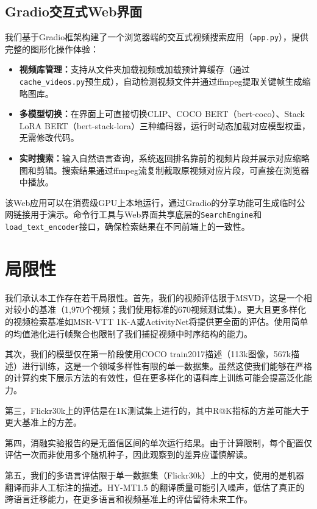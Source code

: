 \documentclass[10pt,a4paper]{ctexart}
\begin{document}
\subsection{Gradio交互式Web界面}

我们基于Gradio框架构建了一个浏览器端的交互式视频搜索应用（\texttt{app.py}），提供完整的图形化操作体验：

\begin{itemize}
  \item \textbf{视频库管理：}支持从文件夹加载视频或加载预计算缓存（通过\texttt{cache\_videos.py}预生成），自动检测视频文件并通过ffmpeg提取关键帧生成缩略图库。
  \item \textbf{多模型切换：}在界面上可直接切换CLIP、COCO BERT（bert-coco）、Stack LoRA BERT（bert-stack-lora）三种编码器，运行时动态加载对应模型权重，无需修改代码。
  \item \textbf{实时搜索：}输入自然语言查询，系统返回排名靠前的视频片段并展示对应缩略图和剪辑。搜索结果通过ffmpeg流复制截取原视频对应片段，可直接在浏览器中播放。
\end{itemize}

该Web应用可以在消费级GPU上本地运行，通过Gradio的分享功能可生成临时公网链接用于演示。命令行工具与Web界面共享底层的\texttt{SearchEngine}和\texttt{load\_text\_encoder}接口，确保检索结果在不同前端上的一致性。

\section{局限性}

我们承认本工作存在若干局限性。首先，我们的视频评估限于MSVD，这是一个相对较小的基准（1,970个视频；我们使用标准的670视频测试集）。更大且更多样化的视频检索基准如MSR-VTT 1K-A或ActivityNet将提供更全面的评估。使用简单的均值池化进行帧聚合也限制了我们捕捉视频中时序结构的能力。

其次，我们的模型仅在第一阶段使用COCO train2017描述（113k图像，567k描述）进行训练，这是一个领域多样性有限的单一数据集。虽然这使我们能够在严格的计算约束下展示方法的有效性，但在更多样化的语料库上训练可能会提高泛化能力。

第三，Flickr30k上的评估是在1K测试集上进行的，其中R@K指标的方差可能大于更大基准上的方差。

第四，消融实验报告的是无置信区间的单次运行结果。由于计算限制，每个配置仅评估一次而非使用多个随机种子，因此观察到的差异应谨慎解读。

第五，我们的多语言评估限于单一数据集（Flickr30k）上的中文，使用的是机器翻译而非人工标注的描述。HY-MT1.5 \citep{hymt152025tencent}的翻译质量可能引入噪声，低估了真正的跨语言迁移能力，在更多语言和视频基准上的评估留待未来工作。
\end{document}
